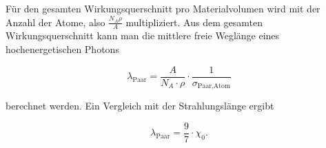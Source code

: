 Für den gesamten Wirkungsquerschnitt pro Materialvolumen wird mit der Anzahl der Atome, also
$\frac{N_A\rho}{A}$ multipliziert. Aus dem gesamten Wirkungsquerschnitt kann man die mittlere freie
Weglänge eines hochenergetischen Photons 

\[\lambda_{\text{Paar}} = \frac{A}{N_A\cdot\rho}\cdot \frac{1}{\sigma_{\text{Paar,Atom}}} \]

berechnet werden. Ein Vergleich mit der Strahlungslänge ergibt 

\[\lambda_{\text{Paar}} = \frac{9}{7}\cdot \chi_0. \]
